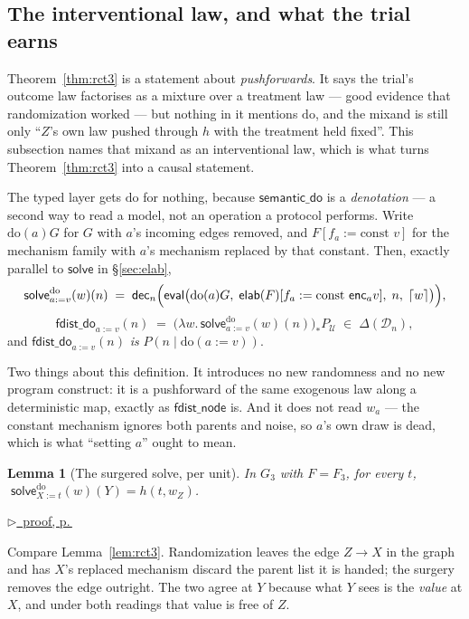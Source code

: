 \documentclass[11pt,a4paper]{article}
\theoremstyle{definition}
\theoremstyle{plain}
\newtheorem{lemma}[definition]{Lemma}
\theoremstyle{remark}
\newcommand{\dom}{\mathcal{D}}
\newcommand{\Ctx}{\mathcal{U}}         %
\newcommand{\solve}{\mathsf{solve}}
\newcommand{\solvedo}{\solve^{\mathrm{do}}}
\newcommand{\fdo}{\mathsf{fdist\_do}}
\newcommand{\enc}{\mathsf{enc}}
\newcommand{\dect}{\mathsf{dec}}
\newcommand{\elab}{\mathsf{elab}}
\newcommand{\ev}{\mathsf{eval}}
\newcommand{\Dist}[1]{\Delta(#1)}      %
\newcommand{\push}[1]{{#1}_{*}}        %
\newcommand{\pfref}[1]{%
  \par\smallskip\noindent
  \hyperref[pf:#1]{\small$\triangleright$\ proof, p.\,\pageref{pf:#1}}\par\smallskip}
\begin{document}
\subsection{The interventional law, and what the trial earns}
\label{sec:do3}

Theorem~\ref{thm:rct3} is a statement about \emph{pushforwards}. It says
the trial's outcome law factorises as a mixture over a treatment law ---
good evidence that randomization worked --- but nothing in it mentions
$\mathrm{do}$, and the mixand is still only ``$Z$'s own law pushed through
$h$ with the treatment held fixed''. This subsection names that mixand as
an interventional law, which is what turns Theorem~\ref{thm:rct3} into a
causal statement.

The typed layer gets $\mathrm{do}$ for nothing, because
$\mathsf{semantic\_do}$ is a \emph{denotation} --- a second way to read a
model, not an operation a protocol performs. Write $\mathrm{do}(a)G$ for
$G$ with $a$'s incoming edges removed, and $F[f_a := \text{const } v]$ for
the mechanism family with $a$'s mechanism replaced by that constant. Then,
exactly parallel to $\solve$ in \S\ref{sec:elab},
\[
  \solvedo_{a := v}(w)(n)
  \;=\;
  \dect_n\Bigl(\ev\bigl(\mathrm{do}(a)G,\;
      \elab(F)[f_a := \text{const } \enc_a v],\; n,\; \lceil w\rceil\bigr)\Bigr),
\]
\[
  \fdo_{a := v}(n)
  \;=\;
  \push{\bigl(\lambda w.\,\solvedo_{a := v}(w)(n)\bigr)} P_\Ctx
  \;\in\; \Dist{\dom_n},
\]
and $\fdo_{a := v}(n)$ \emph{is} $P(n \mid \mathrm{do}(a := v))$.

Two things about this definition. It introduces no new randomness and no
new program construct: it is a pushforward of the same exogenous law along
a deterministic map, exactly as $\mathsf{fdist\_node}$ is. And it does not
read $w_a$ --- the constant mechanism ignores both parents and noise, so
$a$'s own draw is dead, which is what ``setting $a$'' ought to mean.

\begin{lemma}[The surgered solve, per unit]
\label{lem:do3}
In $G_3$ with $F = F_3$, for every $t$,
$\;\solvedo_{X := t}(w)(Y) = h(t, w_Z)$.
\end{lemma}

\pfref{lem:do3}

Compare Lemma~\ref{lem:rct3}. Randomization leaves the edge $Z \to X$ in
the graph and has $X$'s replaced mechanism discard the parent list it is
handed; the surgery removes the edge outright. The two agree at $Y$ because
what $Y$ sees is the \emph{value} at $X$, and under both readings that
value is free of $Z$.
\end{document}
